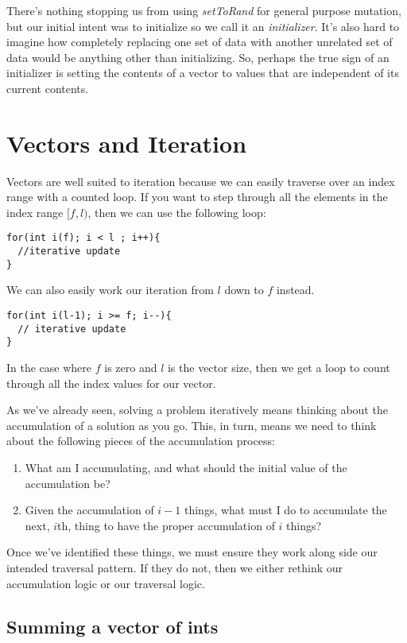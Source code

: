 \documentclass[]{tufte-handout}
\begin{document}
There's nothing stopping us from using \textit{setToRand} for general purpose mutation, but our initial intent was to initialize so we call it an \textit{initializer}.  It's also hard to imagine how completely replacing one set of data with another unrelated set of data would be anything other than initializing. So, perhaps the true sign of an initializer is setting the contents of a vector to values that are independent of its current contents. 

\section{Vectors and Iteration}

Vectors are well suited to iteration because we can easily traverse over an index range with a counted loop. If you want to step through all the elements in the index range $[f,l)$, then we can use the following loop:
\begin{verbatim}
for(int i(f); i < l ; i++){
  //iterative update
}
\end{verbatim}
We can also easily work our iteration from $l$ down to $f$ instead.
\begin{verbatim}
for(int i(l-1); i >= f; i--){
  // iterative update
}
\end{verbatim}
In the  case where $f$ is zero and $l$ is the vector size, then we get a loop to count through all the index values for our vector.

As we've already seen, solving a problem iteratively means thinking about the accumulation of a solution as you go. This, in turn, means we need to think about the following pieces of the accumulation process:
\begin{enumerate}
\item What am I accumulating, and what should the initial value of the accumulation be? 
\item Given the accumulation of $i-1$ things, what must I do to accumulate the next, $i$th, thing to have the proper accumulation of $i$ things?
\end{enumerate}
Once we've identified these things, we must ensure they work along side our intended traversal pattern.  If they do not, then we either rethink our accumulation logic or our traversal logic.

\subsection{Summing a vector of ints}
\end{document}
